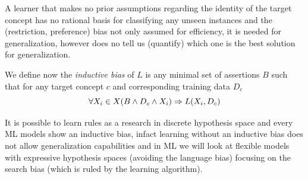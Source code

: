 A learner that makes no prior assumptions regarding the identity of the target concept has no rational basis for classifying any unseen instances and the (restriction, preference) bias 
not only assumed for efficiency, it is needed for generalization, however does no tell us (quantify) which one is the best solution for generalization.

We define now the \emph{inductive bias} of $L$ is any minimal set of assertions $B$ such that for any target concept $c$ and corresponding training data $D_c$
\[ \forall X_i \in X (B \land D_c \land X_i) \Rightarrow L(X_i, D_c) \]

It is possible to learn rules as a research in discrete hypothesis space and every ML models show an inductive bias, infact learning without an inductive bias
does not allow generalization capabilities and in ML we will look at flexible models with expressive hypothesis spaces (avoiding the language bias) 
focusing on the search bias (which is ruled by the learning algorithm).



